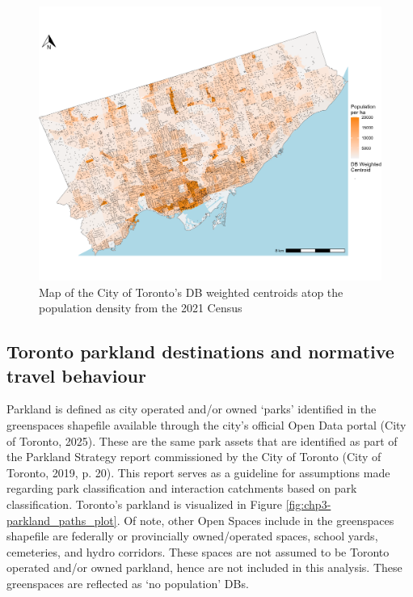 \documentclass[
11pt, %
oneside, %
english, %
singlespacing, %
]{macthesis} %
\begin{document}
\begin{figure}

{\centering \includegraphics[width=6in]{./data/figures/chp3-toronto_popden_DBCent_plot} 

}

\caption{\label{fig:chp3-toronto_popden_DBCent_plot}Map of the City of Toronto's DB weighted centroids atop the population density from the 2021 Census}\label{fig:unnamed-chunk-44}
\end{figure}

\subsection{Toronto parkland destinations and normative travel behaviour}\label{toronto-parkland-destinations-and-normative-travel-behaviour}

Parkland is defined as city operated and/or owned `parks' identified in the greenspaces shapefile available through the city's official Open Data portal (City of Toronto, 2025). These are the same park assets that are identified as part of the Parkland Strategy report commissioned by the City of Toronto (City of Toronto, 2019, p. 20). This report serves as a guideline for assumptions made regarding park classification and interaction catchments based on park classification. Toronto's parkland is visualized in Figure \ref{fig:chp3-parkland_paths_plot}. Of note, other Open Spaces include in the greenspaces shapefile are federally or provincially owned/operated spaces, school yards, cemeteries, and hydro corridors. These spaces are not assumed to be Toronto operated and/or owned parkland, hence are not included in this analysis. These greenspaces are reflected as `no population' DBs.
\end{document}
